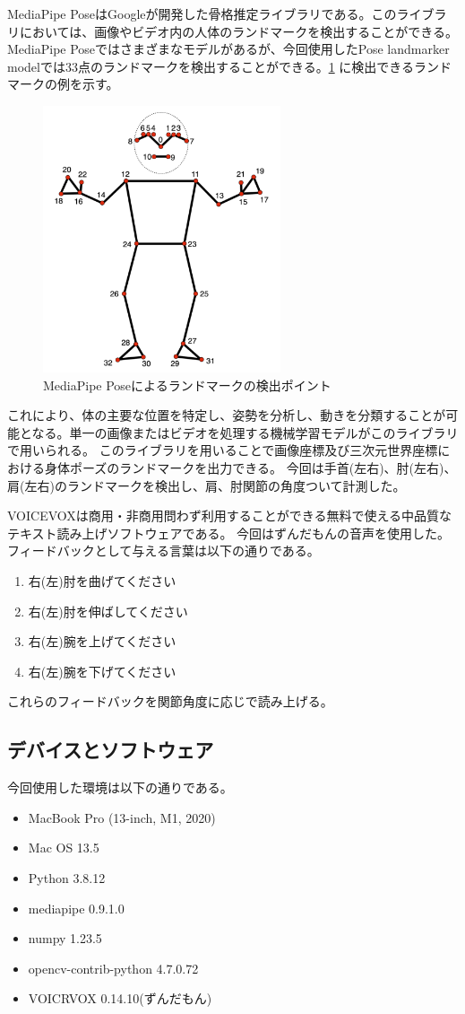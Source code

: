MediaPipe Pose\cite{mediapipe_pose_landmarker}はGoogleが開発した骨格推定ライブラリである。このライブラリにおいては、画像やビデオ内の人体のランドマークを検出することができる。
MediaPipe Poseではさまざまなモデルがあるが、今回使用したPose landmarker modelでは33点のランドマークを検出することができる。\ref{fig:mediapipe} に検出できるランドマークの例を示す。
\begin{figure}[H]
  \begin{center}
    \includegraphics[width=7cm]{figures/mediapipe.png}
    \caption{MediaPipe Poseによるランドマークの検出ポイント}
    \label{fig:mediapipe}
  \end{center}
\end{figure}  
これにより、体の主要な位置を特定し、姿勢を分析し、動きを分類することが可能となる。単一の画像またはビデオを処理する機械学習モデルがこのライブラリで用いられる。
このライブラリを用いることで画像座標及び三次元世界座標における身体ポーズのランドマークを出力できる。
今回は手首(左右)、肘(左右)、肩(左右)のランドマークを検出し、肩、肘関節の角度ついて計測した。

VOICEVOXは商用・非商用問わず利用することができる無料で使える中品質なテキスト読み上げソフトウェアである。
今回はずんだもんの音声を使用した。
フィードバックとして与える言葉は以下の通りである。
\begin{enumerate}
  \item 右(左)肘を曲げてください
  \item 右(左)肘を伸ばしてください
  \item 右(左)腕を上げてください
  \item 右(左)腕を下げてください
\end{enumerate}
これらのフィードバックを関節角度に応じで読み上げる。

\subsection{デバイスとソフトウェア}
今回使用した環境は以下の通りである。
\begin{itemize}
  \item MacBook Pro (13-inch, M1, 2020)
  \item Mac OS 13.5
  \item Python 3.8.12
  \item mediapipe 0.9.1.0
  \item numpy 1.23.5
  \item opencv-contrib-python 4.7.0.72
  \item VOICRVOX 0.14.10(ずんだもん)
\end{itemize}

